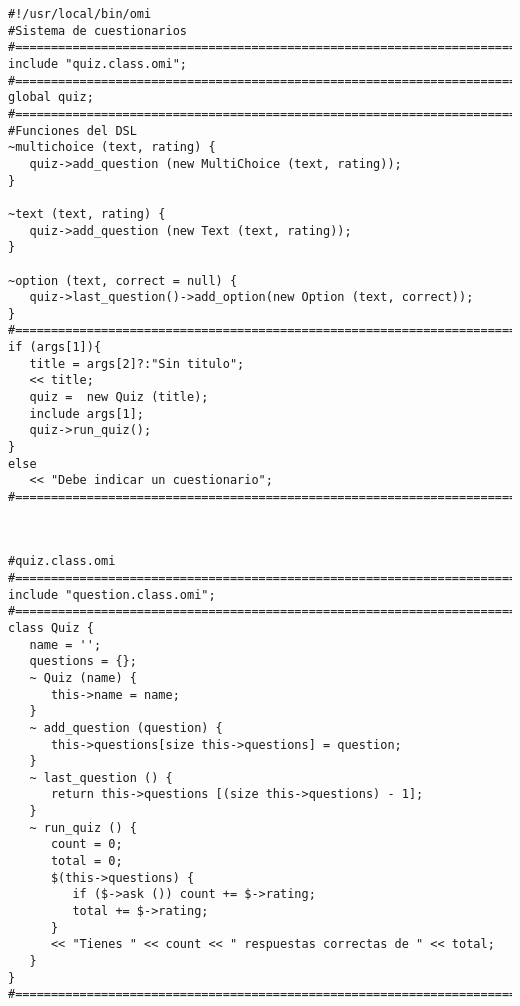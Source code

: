 \begin{lstlisting}[language=omi]
#!/usr/local/bin/omi
#Sistema de cuestionarios
#=======================================================================
include "quiz.class.omi";
#=======================================================================
global quiz;
#=======================================================================
#Funciones del DSL 
~multichoice (text, rating) {
   quiz->add_question (new MultiChoice (text, rating));
}

~text (text, rating) {
   quiz->add_question (new Text (text, rating));
}

~option (text, correct = null) {
   quiz->last_question()->add_option(new Option (text, correct));
}
#=======================================================================
if (args[1]){
   title = args[2]?:"Sin titulo";
   << title;
   quiz =  new Quiz (title);
   include args[1];
   quiz->run_quiz();
}
else
   << "Debe indicar un cuestionario";
#=======================================================================
\end{lstlisting}
\hfill\\

\begin{lstlisting}[language=omi]
#quiz.class.omi
#=======================================================================
include "question.class.omi";
#=======================================================================
class Quiz {
   name = '';
   questions = {};
   ~ Quiz (name) {
      this->name = name;
   }
   ~ add_question (question) {
      this->questions[size this->questions] = question;
   }
   ~ last_question () {
      return this->questions [(size this->questions) - 1];
   }
   ~ run_quiz () {
      count = 0;
      total = 0;
      $(this->questions) {
         if ($->ask ()) count += $->rating;
         total += $->rating;
      }
      << "Tienes " << count << " respuestas correctas de " << total;
   }
}
#=======================================================================
\end{lstlisting}
\hfill\\

